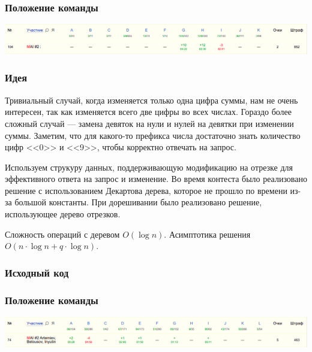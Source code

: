\documentclass[12pt]{article}
\begin{document}
\subsubsection*{Положение команды}
\includegraphics[scale=0.25]{images/gp_dolgop.png}\newline\noindent
\pagebreak




\subsubsection*{Идея}
Тривиальный случай, когда изменяется только одна цифра суммы, нам не очень интересен, так как изменяется всего две цифры во всех числах. Гораздо более сложный случай --- замена девяток на нули и нулей на девятки при изменении суммы. Заметим, что для какого-то префикса числа достаточно знать количество цифр <<0>> и <<9>>, чтобы корректно отвечать на запрос.

Используем струкуру данных, поддерживающую модификацию на отрезке для эффективного ответа на запрос и изменение. Во время контеста было реализовано решение с использованием Декартова дерева, которое не прошло по времени из-за большой константы. При дорешивании было реализовано решение, использующее дерево отрезков.

Сложность операций с деревом $O(\log{n})$. Асимптотика решения $O(n \cdot \log{n} + q \cdot \log{n})$.

\subsubsection*{Исходный код}

\subsubsection*{Положение команды}
\includegraphics[scale=0.25]{images/gp_edg.png}\newline\noindent
\pagebreak
\end{document}
